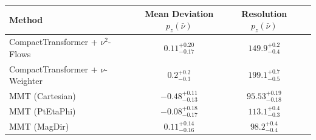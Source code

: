     \begin{tabular}{lccc}
        \toprule
        Method & Mean Deviation $p_{z}(\bar{\nu})$ & Resolution $p_{z}(\bar{\nu})$ \\
        \midrule
        CompactTransformer + $\nu^2$-Flows & $0.11^{+0.20}_{-0.17}$ & $149.9^{+0.2}_{-0.4}$ \\
        CompactTransformer + $\nu$-Weighter & $0.2^{+0.2}_{-0.3}$ & $199.1^{+0.7}_{-0.5}$ \\
        MMT (Cartesian) & $-0.48^{+0.11}_{-0.13}$ & $95.53^{+0.19}_{-0.18}$ \\
        MMT (PtEtaPhi) & $-0.08^{+0.18}_{-0.17}$ & $113.1^{+0.4}_{-0.3}$ \\
        MMT (MagDir) & $0.11^{+0.14}_{-0.16}$ & $98.2^{+0.4}_{-0.4}$ \\
        \bottomrule
    \end{tabular}